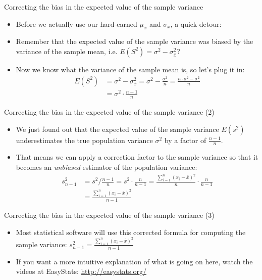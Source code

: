 \begin{frame}{Correcting the bias in the expected value of the sample
variance}

\begin{itemize}
\itemsep1pt\parskip0pt
\item
  Before we actually use our hard-earned \(\mu_{\bar{x}}\) and
  \(\sigma_{\bar{x}}\), a quick detour:
\item
  Remember that the expected value of the sample variance was biased by
  the variance of the sample mean, i.e.
  \(E(S^2) = \sigma^2 - \sigma_{\bar{x}}^2\)?
\item
  Now we know what the variance of the sample mean is, so let's plug it
  in: \[
  \begin{aligned}
  E(S^2) &= \sigma^2 - \sigma_{\bar{x}}^2 = \sigma^2 - \frac{\sigma^2}{n} = \frac{n\cdot\sigma^2-\sigma^2}{n} \\
     &= \sigma^2\cdot\frac{n-1}{n}
  \end{aligned}
  \]
\end{itemize}

\end{frame}

\begin{frame}{Correcting the bias in the expected value of the sample
variance (2)}

\begin{itemize}
\itemsep1pt\parskip0pt
\item
  We just found out that the expected value of the sample variance
  \(E(s^2)\) underestimates the true population variance \(\sigma^2\) by
  a factor of \(\frac{n-1}{n}\).
\item
  That means we can apply a correction factor to the sample variance so
  that it becomes an \emph{unbiased} estimator of the population
  variance: \[
  \begin{aligned}
  s_{n-1}^2 &= s^2 / \frac{n-1}{n} =  s^2\cdot\frac{n}{n-1} = \frac{\sum\limits_{i=1}^n(x_i-\bar{x})^2}{n}\cdot\frac{n}{n-1}\\
        &= \frac{\sum\limits_{i=1}^n(x_i-\bar{x})^2}{n-1}
  \end{aligned}
  \]
\end{itemize}

\end{frame}

\begin{frame}{Correcting the bias in the expected value of the sample
variance (3)}

\begin{itemize}
\itemsep1pt\parskip0pt
\item
  Most statistical software will use this corrected formula for
  computing the sample variance:
  \(s_{n-1}^2 = \frac{\sum\limits_{i=1}^n(x_i-\bar{x})^2}{n-1}\)
\item
  If you want a more intuitive explanation of what is going on here,
  watch the videos at EasyStats:
  \href{http://easystats.org/}{\url{http://easystats.org/}}
\end{itemize}

\end{frame}

